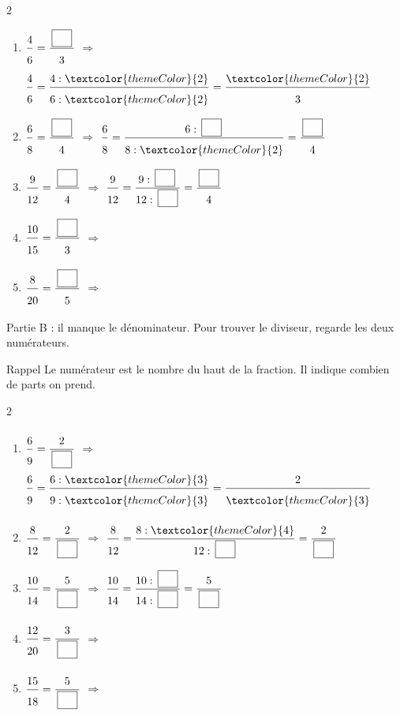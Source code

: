 \begin{multicols}{2}
\begin{enumerate}[leftmargin=*,align=parleft, label=\alph*), itemsep=9pt]
\item $\FA{4}{6}=\FA{\CaseC}{3}$ \quad $\Longrightarrow$ \quad $\FA{4}{6}=\FA{4 : \textcolor{themeColor}{2}}{6 : \textcolor{themeColor}{2}}=\FA{\textcolor{themeColor}{2}}{3}$
\item $\FA{6}{8}=\FA{\CaseC}{4}$ \quad $\Longrightarrow$ \quad $\FA{6}{8}=\FA{6 : \CaseC}{8 : \textcolor{themeColor}{2}}=\FA{\CaseC}{4}$
\item $\FA{9}{12}=\FA{\CaseC}{4}$ \quad $\Longrightarrow$ \quad $\FA{9}{12}=\FA{9 : \CaseC}{12 : \CaseC}=\FA{\CaseC}{4}$
\item $\FA{10}{15}=\FA{\CaseC}{3}$ \quad $\Longrightarrow$
\item $\FA{8}{20}=\FA{\CaseC}{5}$ \quad $\Longrightarrow$
\end{enumerate}
\end{multicols}

\vfill
\textcolor{themeColor}{Partie B} : il manque le dénominateur. Pour trouver le diviseur, regarde les deux numérateurs.

\vspace{10pt}\begin{astuce}{Rappel}
Le \textcolor{themeColor}{numérateur} est le nombre du haut de la fraction. Il indique combien de parts on prend.
\end{astuce}\vspace{15pt}

\begin{multicols}{2}
\begin{enumerate}[leftmargin=*,align=parleft, label=\alph*), itemsep=9pt, start=6]
\item $\FA{6}{9}=\FA{2}{\CaseC}$ \quad $\Longrightarrow$ \quad $\FA{6}{9}=\FA{6 : \textcolor{themeColor}{3}}{9 : \textcolor{themeColor}{3}}=\FA{2}{\textcolor{themeColor}{3}}$
\item $\FA{8}{12}=\FA{2}{\CaseC}$ \quad $\Longrightarrow$ \quad $\FA{8}{12}=\FA{8 : \textcolor{themeColor}{4}}{12 : \CaseC}=\FA{2}{\CaseC}$
\item $\FA{10}{14}=\FA{5}{\CaseC}$ \quad $\Longrightarrow$ \quad $\FA{10}{14}=\FA{10 : \CaseC}{14 : \CaseC}=\FA{5}{\CaseC}$
\item $\FA{12}{20}=\FA{3}{\CaseC}$ \quad $\Longrightarrow$
\item $\FA{15}{18}=\FA{5}{\CaseC}$ \quad $\Longrightarrow$
\end{enumerate}
\end{multicols}

